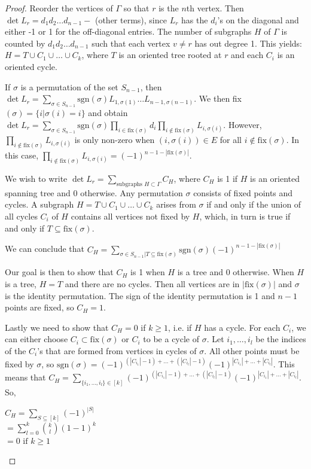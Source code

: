 \documentclass[11pt]{article}
\theoremstyle{definition}
\begin{document}
	\begin{proof}
		Reorder the vertices of $\Gamma$ so that $r$ is the $n$th vertex. 
		Then $\det L_r = d_1d_2 \dots d_{n-1} -$ (other terms), since $L_r$ has the $d_i$'s on the diagonal and either -1 or 1 for the off-diagonal entries. 
		The number of subgraphs $H$ of $\Gamma$ is counted by $d_1d_2 \dots d_{n-1}$ such that each vertex $v \neq r$ has out degree 1. 
		This yields: $H = T \cup C_1 \cup \dots \cup C_k$, where $T$ is an oriented tree rooted at $r$ and each $C_i$ is an oriented cycle. 
		
		If $\sigma$ is a permutation of the set $S_{n-1}$,
		then $\det L_r = \sum_{\sigma \in S_{n-1}} \text{sgn} (\sigma)L_{1, \sigma(1)} \dots L_{n-1, \sigma(n-1)}$.
		We then fix $(\sigma) = \{i | \sigma(i) = i\}$ and obtain 
		$\det L_r = \sum_{\sigma \in S_{n-1}} \text{sgn}(\sigma) \prod_{i \in \text{fix}(\sigma)} d_i \prod_{i \not \in \text{fix}(\sigma)} L_{i, \sigma(i)}$.
		However, $\prod_{i \not \in \text{fix}(\sigma)} L_{i, \sigma(i)}$ is only non-zero when $(i,\sigma(i)) \in E$ for all $i \not \in \text{fix}(\sigma)$.
		In this case, $\prod_{i \not \in \text{fix}(\sigma)} L_{i, \sigma(i)} = (-1)^{n -1 - | \text{fix}(\sigma)|}$.
		
		We wish to write $\det L_r = \sum_{\text{subgraphs } H \subset \Gamma} C_H$, where $C_H$ is 1 if $H$ is an oriented spanning tree and 0 otherwise.
		Any permutation $\sigma$ consists of fixed points and cycles. A subgraph $H = T \cup C_1 \cup \dots \cup C_k$ arises from $\sigma$ if and only if the union of all cycles $C_i$ of $H$ contains all vertices not fixed by $H$, which, in turn is true if and only if $T \subseteq \text{fix}(\sigma)$.
		
		We can conclude that $ C_H = \sum_{\sigma \in S_{n-1} | T \subseteq \text{fix}(\sigma)} \text{sgn}(\sigma)(-1)^{n -1 - | \text{fix}(\sigma)|}$
		
		Our goal is then to show that $C_H$ is 1 when $H$ is a tree and 0 otherwise. When $H$ is a tree, $H = T$ and there are no cycles. Then all vertices are in $|\text{fix}(\sigma)|$ and $\sigma$ is the identity permutation.
		The sign of the identity permutation is 1 and $n-1$ points are fixed, so $C_H = 1$.
		
		Lastly we need to show that $C_H = 0$ if $k \geq 1$, i.e. if $H$ has a cycle. 
		For each $C_i$, we can either choose $C_i \subset \text{fix}(\sigma)$ or $C_i$ to be a cycle of $\sigma$. 
		Let $i_1, \dots, i_l$ be the indices of the $C_i$'s that are formed from vertices in cycles of $\sigma$. 
		All other points must be fixed by $\sigma$, so $\text{sgn}(\sigma) = (-1)^{(|C_{i_1}| -1) + \dots + (|C_{i_l}| -1)} (-1)^{|C_{i_1}| + \dots + |C_{i_l}|}$.
		This means that $C_H = \sum_{\{i_1, \dots, i_l\} \in [k]} (-1)^{(|C_{i_1}| -1) + \dots + (|C_{i_l}| -1)} (-1)^{|C_{i_1}| + \dots + |C_{i_l}|}$.
		So, 
		\begin{center}
			$C_H = \sum_{S \subseteq [k]}(-1)^{|S|}$ \\
			$ = \sum_{l=0}^{k} {k \choose l} (1-1)^k$ \\
			$ = 0 \text{ if } k \geq 1$
		\end{center}
	\end{proof}
	
\end{document}
